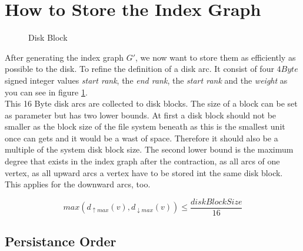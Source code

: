 \section{How to Store the Index Graph}\label{sec:how_to_store}

\begin{figure}
    \centering
    
\caption{Disk Block}
    \label{fig:disk_block}
\end{figure}

After generating the index graph $G'$, we now want to store them as efficiently as possible to the disk.
To refine the definition of a disk arc.
It consist of four $4 Byte$ signed integer values \textit{start rank}, the \textit{end rank}, the \textit{start rank} and the \textit{weight} as you can see in figure \ref{fig:disk_block}.
\\
This 16 Byte disk arcs are collected to disk blocks.
The size of a block can be set as parameter but has two lower bounds.
At first a disk block should not be smaller as the block size of the file system beneath as this is the smallest unit once can gets and it would be a wast of space.
Therefore it should also be a multiple of the system disk block size.
The second lower bound is the maximum degree that exists in the index graph after the contraction, as all arcs of one vertex, as all upward arcs a vertex have to be stored int the same disk block.
This applies for the downward arcs, too.

\begin{equation*}
    max(d_{\uparrow max}(v), d_{\downarrow max}(v)) \leqslant  \frac{diskBlockSize}{16}  
\end{equation*}

\subsection{Persistance Order}\label{sec:persistanceOrder}



